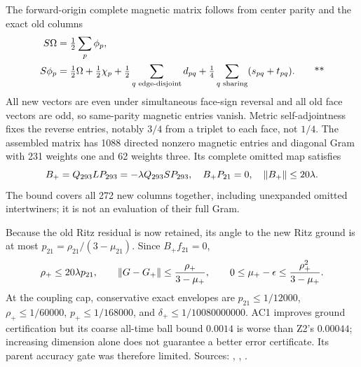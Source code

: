 The forward-origin complete magnetic matrix follows from center parity and the
exact old columns
\begin{align}
 S\Omega&=\tfrac12\sum_p\phi_p,\notag\\
 S\phi_p&=\tfrac12\Omega+\tfrac12\chi_p
 +\tfrac12\sum_{q\text{ edge-disjoint}}d_{pq}
 +\tfrac14\sum_{q\text{ sharing}}(s_{pq}+t_{pq}).\qquad\text{**}
 \label{recent:matrix293}
\end{align}
All new vectors are even under simultaneous face-sign reversal and all old
face vectors are odd, so same-parity magnetic entries vanish.  Metric
self-adjointness fixes the reverse entries, notably $3/4$ from a triplet to
each face, not $1/4$.  The assembled matrix has 1088 directed nonzero magnetic
entries and diagonal Gram with 231 weights one and 62 weights three.
Its complete omitted map satisfies
\begin{equation}
 B_+=Q_{293}LP_{293}=-\lambda Q_{293}SP_{293},\quad
 B_+P_{21}=0,\quad\left\lVert B_+\right\rVert\le20\lambda.
 \label{recent:new-leakage}
\end{equation}
The bound covers all 272 new columns together, including unexpanded omitted
intertwiners; it is not an evaluation of their full Gram.

Because the old Ritz residual is now retained, its angle to the new Ritz
ground is at most $p_{21}=\rho_{21}/(3-\mu_{21})$.  Since $B_+f_{21}=0$,
\begin{equation}
 \rho_+\le20\lambda p_{21},\qquad
 \left\lVert G-G_+\right\rVert\le\frac{\rho_+}{3-\mu_+},\qquad
 0\le\mu_+-\epsilon\le\frac{\rho_+^2}{3-\mu_+}.
 \label{recent:ground293}
\end{equation}
At the coupling cap, conservative exact envelopes are
$p_{21}\le1/12000$, $\rho_+\le1/60000$,
$p_+\le1/168000$, and $\delta_+\le1/10080000000$.
AC1 improves ground certification but its coarse all-time ball bound $0.0014$
is worse than Z2's $0.00044$; increasing dimension alone does not guarantee a
better error certificate.  Its parent accuracy gate was therefore limited.
Sources: ,
,
.

